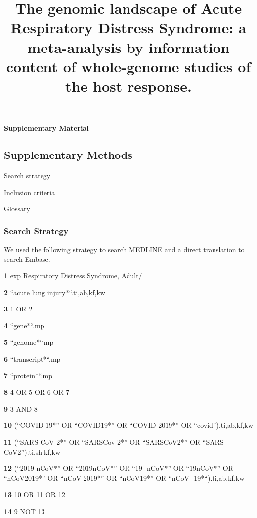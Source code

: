 \documentclass[
  11,
  a4paper,
]{article}
\title{The genomic landscape of Acute Respiratory Distress Syndrome: a
meta-analysis by information content of whole-genome studies of the host
response.}
\author{}
\date{}
\begin{document}
\maketitle

\begin{center}

\textbf{\LARGE Supplementary Material}

\end{center}

\newpage

\subsection{Supplementary Methods}\label{supplementary-methods}

Search strategy

Inclusion criteria

Glossary

\newpage

\subsubsection{Search Strategy}\label{search-strategy}

We used the following strategy to search MEDLINE and a direct
translation to search Embase.

\textbf{1} exp Respiratory Distress Syndrome, Adult/

\textbf{2} ``acute lung injury*``.ti,ab,kf,kw

\textbf{3} 1 OR 2

\textbf{4} ``gene*``.mp

\textbf{5} ``genome*``.mp

\textbf{6} ``transcript*``.mp

\textbf{7} ``protein*``.mp

\textbf{8} 4 OR 5 OR 6 OR 7

\textbf{9} 3 AND 8

\textbf{10} (``COVID-19*'' OR ``COVID19*'' OR ``COVID-2019*'' OR
``covid'').ti,ab,kf,kw

\textbf{11} (``SARS-CoV-2*'' OR ``SARSCov-2*'' OR ``SARSCoV2*'' OR
``SARS-CoV2'').ti,sh,kf,kw

\textbf{12} (``2019-nCoV*'' OR ``2019nCoV*'' OR ``19- nCoV*'' OR
``19nCoV*'' OR ``nCoV2019*'' OR ``nCoV-2019*'' OR ``nCoV19*'' OR ``nCoV-
19*``).ti,ab,kf,kw

\textbf{13} 10 OR 11 OR 12

\textbf{14} 9 NOT 13
\end{document}
